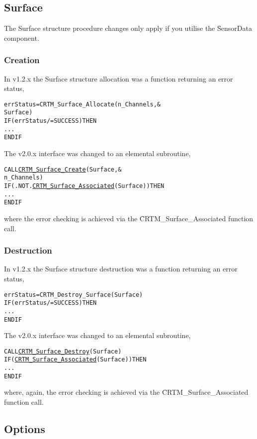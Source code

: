 \subsection{Surface}
The Surface structure procedure changes only apply if you utilise the \f{SensorData} component.

\subsubsection{Creation}
In v1.2.x the Surface structure allocation was a function returning an error status,
\begin{alltt}
  errStatus = CRTM_Surface_Allocate( n_Channels, &
                                     Surface     )
  IF ( errStatus /= SUCCESS ) THEN
    ...
  END IF\end{alltt}
The v2.0.x interface was changed to an elemental subroutine,
\begin{alltt}
  CALL \hyperref[sec:CRTM_Surface_Create_interface]{CRTM_Surface_Create}( Surface,   &
                            n_Channels )
  IF ( .NOT. \hyperref[sec:CRTM_Surface_Associated_interface]{CRTM_Surface_Associated}( Surface ) ) THEN
    ...
  END IF\end{alltt}
where the error checking is achieved via the \f{CRTM\_Surface\_Associated} function call.


\subsubsection{Destruction}
In v1.2.x the Surface structure destruction was a function returning an error status,
\begin{alltt}
  errStatus = CRTM_Destroy_Surface( Surface )
  IF ( errStatus /= SUCCESS ) THEN
    ...
  END IF\end{alltt}
The v2.0.x interface was changed to an elemental subroutine,
\begin{alltt}
  CALL \hyperref[sec:CRTM_Surface_Destroy_interface]{CRTM_Surface_Destroy}( Surface )
  IF ( \hyperref[sec:CRTM_Surface_Associated_interface]{CRTM_Surface_Associated}( Surface ) ) THEN
    ...
  END IF\end{alltt}
where, again, the error checking is achieved via the \f{CRTM\_Surface\_Associated} function call.


\subsection{Options}

